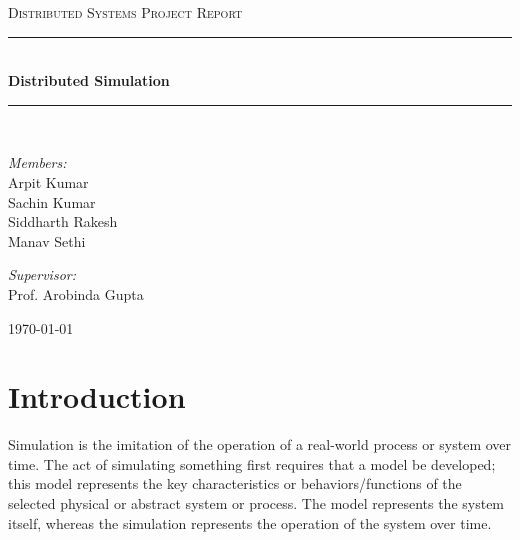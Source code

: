 \documentclass[12pt,a4paper]{article}
\newcommand{\HRule}{\rule{\linewidth}{0.5mm}}
\begin{document}


\begin{titlepage}
\begin{center}



\textsc{\Large Distributed Systems Project Report }\\[0.5cm]

\HRule \\[0.4cm]
{ \huge \bfseries Distributed Simulation \\[0.4cm] }

\HRule \\[1.5cm]

\begin{minipage}{0.4\textwidth}
\begin{flushleft} \large
\emph{Members:}\\
Arpit Kumar\\
Sachin Kumar\\
Siddharth Rakesh\\
Manav Sethi\\
\end{flushleft}
\end{minipage}
\begin{minipage}{0.4\textwidth}
\begin{flushright} \large
\emph{Supervisor:} \\
Prof. Arobinda Gupta
\end{flushright}
\end{minipage}

\vfill

{\large \today}

\end{center}
\end{titlepage}

\tableofcontents
\newpage

\section{Introduction}
Simulation is the imitation of the operation of a real-world process or system over time. The act of simulating something first requires that a model be developed; this model represents the key characteristics or behaviors/functions of the selected physical or abstract system or process. The model represents the system itself, whereas the simulation represents the operation of the system over time.
\end{document}
